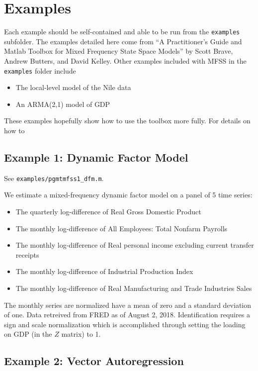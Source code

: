 \documentclass{article}
\begin{document}
\section{Examples}

Each example should be self-contained and able to be run from the \texttt{examples} subfolder. The examples detailed here come from ``A Practitioner's Guide and Matlab Toolbox for Mixed Frequency State Space Models'' by Scott Brave, Andrew Butters, and David Kelley. Other examples included with MFSS in the \texttt{examples} folder include 
\begin{itemize}
  \item The local-level model of the Nile data
  \item An ARMA(2,1) model of GDP
\end{itemize}

These examples hopefully show how to use the toolbox more fully. For details on how to 

\subsection{Example 1: Dynamic Factor Model}

See \texttt{examples/pgmtmfss1\_dfm.m}. 

We estimate a mixed-frequency dynamic factor model on a panel of 5 time series: 
\begin{itemize}
  \item The quarterly log-difference of Real Gross Domestic Product
  \item The monthly log-difference of All Employees: Total Nonfarm Payrolls
  \item The monthly log-difference of Real personal income excluding current transfer receipts
  \item The monthly log-difference of Industrial Production Index
  \item The monthly log-difference of Real Manufacturing and Trade Industries Sales
\end{itemize}
The monthly series are normalized have a mean of zero and a standard deviation of one. Data retreived from FRED as of August 2, 2018. Identification requires a sign and scale normalization which is accomplished through setting the loading on GDP (in the $Z$ matrix) to 1. 

\subsection{Example 2: Vector Autoregression}
\end{document}
